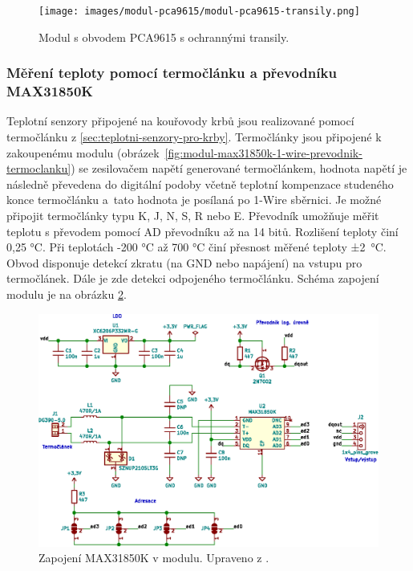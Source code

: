 \begin{figure}[H]
    \centering
    \texttt{[image: images/modul-pca9615/modul-pca9615-transily.png]}
    \caption[Modul s obvodem PCA9615 s transily.]{Modul s obvodem PCA9615 s ochrannými transily.}
    \label{fig:modul-pca9615-transily}
\end{figure}

\subsubsection{Měření teploty pomocí termočlánku a převodníku MAX31850K}
Teplotní senzory připojené na kouřovody krbů jsou realizované pomocí termočlánku z \ref{sec:teplotni-senzory-pro-krby}. Termočlánky jsou připojené k zakoupenému modulu (obrázek~\ref{fig:modul-max31850k-1-wire-prevodnik-termoclanku}) se zesilovačem napětí generované termočlánkem, hodnota napětí je následně převedena do digitální podoby včetně teplotní kompenzace studeného konce termočlánku a~tato hodnota je posílaná po 1-Wire sběrnici. Je možné připojit termočlánky typu K, J, N, S, R nebo E. Převodník umožňuje měřit teplotu s převodem pomocí AD převodníku až na 14 bitů. Rozlišení teploty činí 0,25 °C. Při teplotách -200 °C až 700 °C činí přesnost měřené teploty ±2~°C. Obvod disponuje detekcí zkratu (na GND nebo napájení) na vstupu pro termočlánek. Dále je zde detekci odpojeného termočlánku. Schéma zapojení modulu je na obrázku \ref{fig:zapojeni-max31850k-1-wire-prevodnik-termoclanku}.

\begin{figure}[H]
    \centering
    \includegraphics[width=\textwidth]{images/svg/kicad/zapojeni-max31850k-1-wire-prevodnik-termoclanku.eps}
    \caption[Zapojení MAX31850K v modulu.]{Zapojení MAX31850K v modulu. Upraveno z \cite{prevodnik-max31850k}.}
    \label{fig:zapojeni-max31850k-1-wire-prevodnik-termoclanku}
\end{figure}


